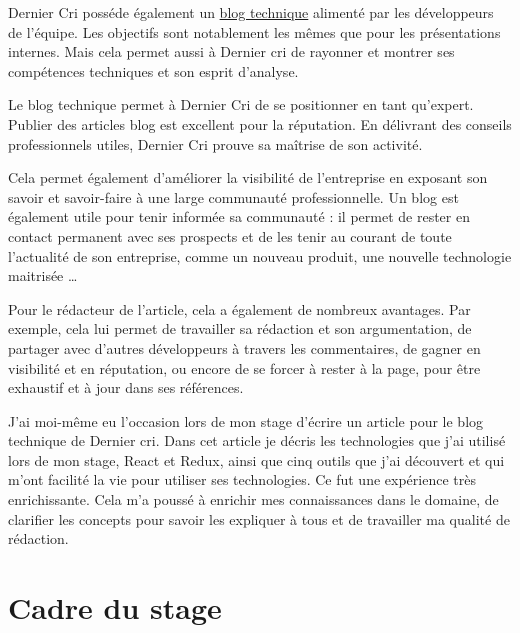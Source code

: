 \documentclass[12pt,a4paper]{article}
\begin{document}
  Dernier Cri posséde également un
  \href{http://derniercri.io/tech-blog}{blog technique} alimenté par les
  développeurs de l'équipe. Les objectifs sont notablement les mêmes que
  pour les présentations internes. Mais cela permet aussi à Dernier cri de
  rayonner et montrer ses compétences techniques et son esprit d'analyse.

  \bigskip

  Le blog technique permet à Dernier Cri de se positionner en tant
  qu'expert. Publier des articles blog est excellent pour la réputation.
  En délivrant des conseils professionnels utiles, Dernier Cri prouve sa
  maîtrise de son activité.

  \bigskip

  Cela permet également d'améliorer la visibilité de l'entreprise en
  exposant son savoir et savoir-faire à une large communauté
  professionnelle. Un blog est également utile pour tenir informée sa
  communauté : il permet de rester en contact permanent avec ses prospects
  et de les tenir au courant de toute l'actualité de son entreprise, comme
  un nouveau produit, une nouvelle technologie maitrisée \ldots{}

  \bigskip

  Pour le rédacteur de l'article, cela a également de nombreux avantages.
  Par exemple, cela lui permet de travailler sa rédaction et son
  argumentation, de partager avec d'autres développeurs à travers les
  commentaires, de gagner en visibilité et en réputation, ou encore de se
  forcer à rester à la page, pour être exhaustif et à jour dans ses
  références.

  \bigskip

  J'ai moi-même eu l'occasion lors de mon stage d'écrire un article pour
  le blog technique de Dernier cri. Dans cet article je décris les
  technologies que j'ai utilisé lors de mon stage, React et Redux, ainsi
  que cinq outils que j'ai découvert et qui m'ont facilité la vie pour
  utiliser ses technologies. Ce fut une expérience très enrichissante.
  Cela m'a poussé à enrichir mes connaissances dans le domaine, de
  clarifier les concepts pour savoir les expliquer à tous et de travailler
  ma qualité de rédaction.

  \newpage

  \section{Cadre du stage}\label{cadre-du-stage}

  \bigskip
\end{document}
